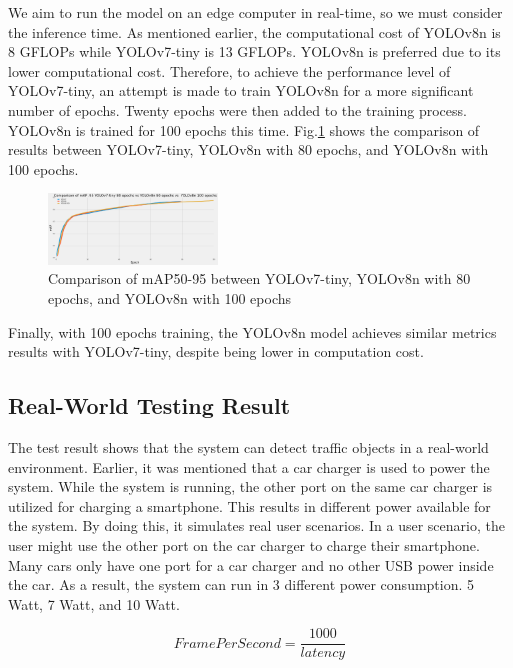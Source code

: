 \documentclass[conference]{IEEEtran}
\begin{document}
We aim to run the model on an edge computer in real-time, so we must consider the inference time. As mentioned earlier, the computational cost of YOLOv8n is 8 GFLOPs while YOLOv7-tiny is 13 GFLOPs.
YOLOv8n is preferred due to its lower computational cost. Therefore, to achieve the performance level of YOLOv7-tiny, an attempt is made to train YOLOv8n for a more significant number of epochs. Twenty epochs were then added to the training process. YOLOv8n is trained for 100 epochs this time. Fig.\ref{fig:YOLOv7vsYOLOv8,80,100} shows the comparison of results between YOLOv7-tiny, YOLOv8n with 80 epochs, and YOLOv8n with 100 epochs.
\begin{figure}[h!]
\centering
\includegraphics[width=0.4\textwidth,keepaspectratio]{YOLOv7vs YOLOv8,80,100.png}
\caption{Comparison of mAP50-95 between YOLOv7-tiny, YOLOv8n with 80 epochs, and YOLOv8n with 100 epochs}
\label{fig:YOLOv7vsYOLOv8,80,100}
\end{figure}
Finally, with 100 epochs training, the YOLOv8n model achieves similar metrics results with YOLOv7-tiny, despite being lower in computation cost.

\subsection{Real-World Testing Result}
The test result shows that the system can detect traffic objects in a real-world environment. Earlier, it was mentioned that a car charger is used to power the system. While the system is running, the other port on the same car charger is utilized for charging a smartphone. This results in different power available for the system. By doing this, it simulates real user scenarios. In a user scenario, the user might use the other port on the car charger to charge their smartphone. Many cars only have one port for a car charger and no other USB power inside the car. As a result, the system can run in 3 different power consumption. 5 Watt, 7 Watt, and 10 Watt.

\begin{equation}\label{FPS}
    Frame Per Second = \frac{1000}{latency}
\end{equation}
\end{document}

